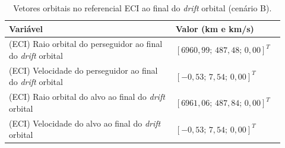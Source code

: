 \begin{table}[H]
\centering
\caption{Vetores orbitais no referencial ECI ao final do \emph{drift} orbital (cenário B).}
\label{tab:cap4_eciB_final}
\begingroup
\small
\setlength{\tabcolsep}{4pt}
\renewcommand{\arraystretch}{1.15}
\begin{tabular}{|p{0.58\linewidth}|p{0.34\linewidth}|}
\hline
Variável & Valor (km e km/s)\\
\hline
(ECI) Raio orbital do perseguidor ao final do \emph{drift} orbital &
$\left[6960,99;\,487,48;\,0,00\right]^T$\\
\hline
(ECI) Velocidade do perseguidor ao final do \emph{drift} orbital &
$\left[-0,53;\,7,54;\,0,00\right]^T$\\
\hline
(ECI) Raio orbital do alvo ao final do \emph{drift} orbital &
$\left[6961,06;\,487,84;\,0,00\right]^T$\\
\hline
(ECI) Velocidade do alvo ao final do \emph{drift} orbital &
$\left[-0,53;\,7,54;\,0,00\right]^T$\\
\hline
\end{tabular}
\endgroup
\end{table}
